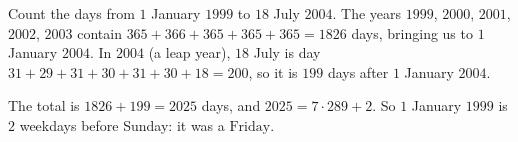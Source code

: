 Count the days from $1$ January $1999$ to $18$ July $2004$. The years $1999$, $2000$, $2001$, $2002$, $2003$ contain $365+366+365+365+365=1826$ days, bringing us to $1$ January $2004$. In $2004$ (a leap year), $18$ July is day $31+29+31+30+31+30+18=200$, so it is $199$ days after $1$ January $2004$.

The total is $1826+199=2025$ days, and $2025=7\cdot289+2$. So $1$ January $1999$ is $2$ weekdays before Sunday: it was a $\boxed{\text{Friday}}$.

